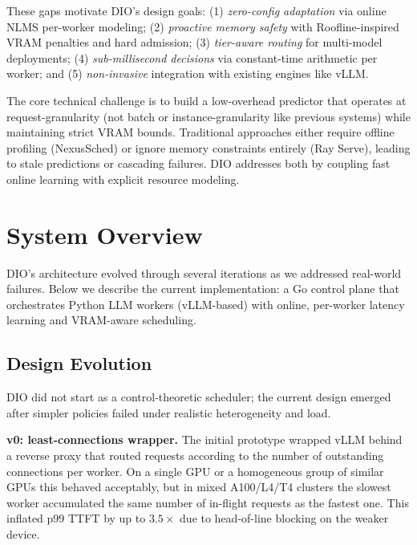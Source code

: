 \documentclass[10pt,twocolumn,letterpaper]{article}
\begin{document}
These gaps motivate DIO's design goals: (1) \emph{zero-config adaptation} via online NLMS per-worker modeling; (2) \emph{proactive memory safety} with Roofline-inspired VRAM penalties and hard admission; (3) \emph{tier-aware routing} for multi-model deployments; (4) \emph{sub-millisecond decisions} via constant-time arithmetic per worker; and (5) \emph{non-invasive} integration with existing engines like vLLM.

The core technical challenge is to build a low-overhead predictor that operates at request-granularity (not batch or instance-granularity like previous systems) while maintaining strict VRAM bounds. Traditional approaches either require offline profiling (NexusSched) or ignore memory constraints entirely (Ray Serve), leading to stale predictions or cascading failures. DIO addresses both by coupling fast online learning with explicit resource modeling.


\section{System Overview}
\label{sec:design}

DIO's architecture evolved through several iterations as we addressed real-world failures. Below we describe the current implementation: a Go control plane that orchestrates Python LLM workers (vLLM-based) with online, per-worker latency learning and VRAM-aware scheduling.

\subsection{Design Evolution}

DIO did not start as a control-theoretic scheduler; the current design emerged after simpler policies failed under realistic heterogeneity and load.

\noindent \textbf{v0: least-connections wrapper.}
The initial prototype wrapped vLLM behind a reverse proxy that routed requests according to the number of outstanding connections per worker. On a single GPU or a homogeneous group of similar GPUs this behaved acceptably, but in mixed A100/L4/T4 clusters the slowest worker accumulated the same number of in-flight requests as the fastest one. This inflated p99 TTFT by up to $3.5{\times}$ due to head-of-line blocking on the weaker device.
\end{document}
